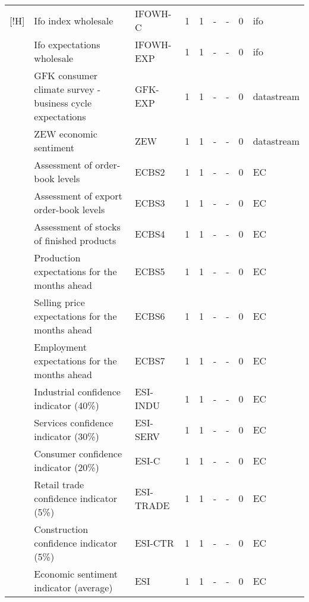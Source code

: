 \documentclass[10pt]{article}
\begin{document}
\begin{footnotesize}
\begin{longtable}{p{1in}|p{2.5in}|p{1in}|p{.1in}|p{.1in}|p{.1in}|p{.15in}|p{.1in}|p{.5in}}[!H]
 & {\tiny{}Ifo index wholesale} & {\tiny{}IFOWH-C} & {\tiny{}1} & {\tiny{}1} & {\tiny{}-} & {\tiny{}-} & {\tiny{}0} & {\tiny{}ifo}\tabularnewline
 & {\tiny{}Ifo expectations wholesale} & {\tiny{}IFOWH-EXP} & {\tiny{}1} & {\tiny{}1} & {\tiny{}-} & {\tiny{}-} & {\tiny{}0} & {\tiny{}ifo}\tabularnewline
 & {\tiny{}GFK consumer climate survey - business cycle expectations} & {\tiny{}GFK-EXP} & {\tiny{}1} & {\tiny{}1} & {\tiny{}-} & {\tiny{}-} & {\tiny{}0} & {\tiny{}datastream}\tabularnewline
 & {\tiny{}ZEW economic sentiment} & {\tiny{}ZEW} & {\tiny{}1} & {\tiny{}1} & {\tiny{}-} & {\tiny{}-} & {\tiny{}0} & {\tiny{}datastream}\tabularnewline
 & {\tiny{}Assessment of order-book levels } & {\tiny{}ECBS2} & {\tiny{}1} & {\tiny{}1} & {\tiny{}-} & {\tiny{}-} & {\tiny{}0} & {\tiny{}EC}\tabularnewline
 & {\tiny{}Assessment of export order-book levels } & {\tiny{}ECBS3} & {\tiny{}1} & {\tiny{}1} & {\tiny{}-} & {\tiny{}-} & {\tiny{}0} & {\tiny{}EC}\tabularnewline
 & {\tiny{}Assessment of stocks of finished products } & {\tiny{}ECBS4} & {\tiny{}1} & {\tiny{}1} & {\tiny{}-} & {\tiny{}-} & {\tiny{}0} & {\tiny{}EC}\tabularnewline
 & {\tiny{}Production expectations for the months ahead } & {\tiny{}ECBS5} & {\tiny{}1} & {\tiny{}1} & {\tiny{}-} & {\tiny{}-} & {\tiny{}0} & {\tiny{}EC}\tabularnewline
 & {\tiny{}Selling price expectations for the months ahead } & {\tiny{}ECBS6} & {\tiny{}1} & {\tiny{}1} & {\tiny{}-} & {\tiny{}-} & {\tiny{}0} & {\tiny{}EC}\tabularnewline
 & {\tiny{}Employment expectations for the months ahead } & {\tiny{}ECBS7} & {\tiny{}1} & {\tiny{}1} & {\tiny{}-} & {\tiny{}-} & {\tiny{}0} & {\tiny{}EC}\tabularnewline
 & {\tiny{}Industrial confidence indicator (40\%)} & {\tiny{}ESI-INDU} & {\tiny{}1} & {\tiny{}1} & {\tiny{}-} & {\tiny{}-} & {\tiny{}0} & {\tiny{}EC}\tabularnewline
 & {\tiny{}Services confidence indicator (30\%)} & {\tiny{}ESI-SERV} & {\tiny{}1} & {\tiny{}1} & {\tiny{}-} & {\tiny{}-} & {\tiny{}0} & {\tiny{}EC}\tabularnewline
 & {\tiny{}Consumer confidence indicator (20\%)} & {\tiny{}ESI-C} & {\tiny{}1} & {\tiny{}1} & {\tiny{}-} & {\tiny{}-} & {\tiny{}0} & {\tiny{}EC}\tabularnewline
 & {\tiny{}Retail trade confidence indicator (5\%)} & {\tiny{}ESI-TRADE} & {\tiny{}1} & {\tiny{}1} & {\tiny{}-} & {\tiny{}-} & {\tiny{}0} & {\tiny{}EC}\tabularnewline
 & {\tiny{}Construction confidence indicator (5\%)} & {\tiny{}ESI-CTR} & {\tiny{}1} & {\tiny{}1} & {\tiny{}-} & {\tiny{}-} & {\tiny{}0} & {\tiny{}EC}\tabularnewline
 & {\tiny{}Economic sentiment indicator (average)} & {\tiny{}ESI} & {\tiny{}1} & {\tiny{}1} & {\tiny{}-} & {\tiny{}-} & {\tiny{}0} & {\tiny{}EC}\tabularnewline

\end{longtable}
\end{footnotesize}
\end{document}
